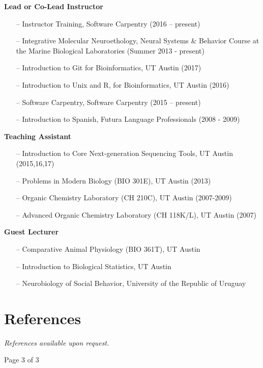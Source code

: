 \documentclass[margin,line]{resume}
\begin{document}
\begin{resume}
\begin{itemize}
\end{itemize}

{\bf Lead or Co-Lead Instructor }
\begin{itemize}
\raggedright
\item[--] Instructor Training, Software Carpentry (2016 – present)
\item[--] Integrative Molecular Neuroethology, Neural Systems \& Behavior Course at the Marine Biological Laboratories (Summer 2013 - present)
\item[--] Introduction to Git for Bioinformatics, UT Austin (2017)
\item[--] Introduction to Unix and R, for Bioinformatics, UT Austin (2016)
\item[--] Software Carpentry, Software Carpentry (2015 – present)
\item[--] Introduction to Spanish, Futura Language Professionals (2008 - 2009)
\end{itemize}

{\bf Teaching Assistant}
\begin{itemize}

\item[--] Introduction to Core Next-generation Sequencing Tools, UT Austin (2015,16,17)
\item[--] Problems in Modern Biology (BIO 301E), UT Austin (2013)
\item[--] Organic Chemistry Laboratory (CH 210C), UT Austin (2007-2009)
\item[--] Advanced Organic Chemistry Laboratory (CH 118K/L), UT Austin (2007)
\end{itemize}

{\bf Guest Lecturer}

\begin{itemize}

\item[--] Comparative Animal Physiology (BIO 361T), UT Austin
\item[--] Introduction to Biological Statistics, UT Austin
\item[--] Neurobiology of Social Behavior, University of the Republic of Uruguay 
\end{itemize}

\section{\mysidestyle References}

{\em References available upon request.}


\vspace{1.5 cm}
{\centerline {Page 3 of 3}}

\end{resume}
\end{document}
